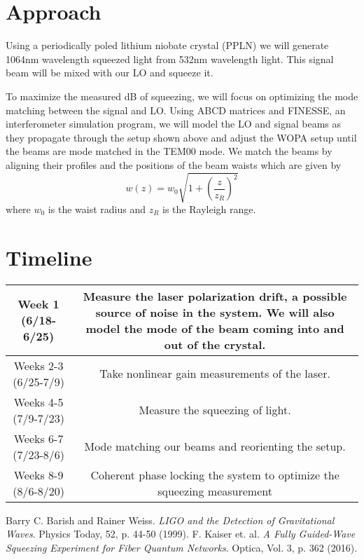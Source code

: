 \documentclass[colorlinks=true,pdfstartview=FitV,linkcolor=blue,
citecolor=red,urlcolor=magenta]{ligodoc}
\begin{document}
\section{Approach}
Using a periodically poled lithium niobate crystal (PPLN) we will generate 1064nm wavelength squeezed light from 532nm wavelength light. This signal beam will be mixed with our LO and squeeze it.

To maximize the measured dB of squeezing, we will focus on optimizing the mode matching between the signal and LO. Using ABCD matrices and FINESSE, an interferometer simulation program, we will model the LO and signal beams as they propagate through the setup shown above and adjust the WOPA setup until the beams are mode matched in the TEM00 mode. We match the beams by aligning their profiles and the positions of the beam waists which are given by
$$w(z)=w_0\sqrt{1+\left(\frac{z}{z_R}\right)^2}$$
where $w_0$ is the waist radius and $z_R$ is the Rayleigh range. 
\section{Timeline}
\begin{center}
\begin{tabular}{|c|c|}
    \hline
    Week 1 (6/18-6/25) & Measure the laser polarization drift, a possible source of noise in the system. We will also model the mode of the beam coming into and out of the crystal.\\
   \hline
    Weeks 2-3 (6/25-7/9) & Take nonlinear gain measurements of the laser.\\
    \hline
    Weeks 4-5 (7/9-7/23) & Measure the squeezing of light. \\
    \hline
    Weeks 6-7 (7/23-8/6) & Mode matching our beams and reorienting the setup.\\
    \hline
    Weeks 8-9 (8/6-8/20) & Coherent phase locking the system to optimize the squeezing measurement\\
    \hline
\end{tabular}
\end{center}    
\begin{thebibliography}{9}
 Barry C. Barish and Rainer Weiss. \emph{LIGO and the Detection of Gravitational Waves}. Physics Today, 52, p. 44-50 (1999).
 F. Kaiser et. al. \emph{A Fully Guided-Wave Squeezing Experiment for Fiber Quantum Networks}. Optica, Vol. 3, p. 362 (2016).

\end{thebibliography}
\end{document}
